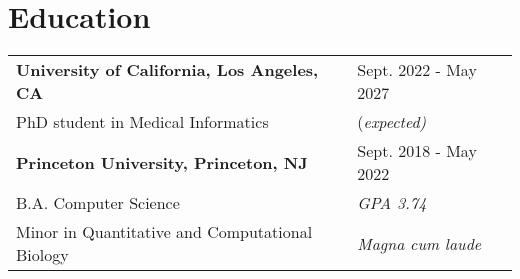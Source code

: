 \documentclass[a4paper,12pt]{article}
\begin{document}




\section{Education}
\begin{tabularx}{\linewidth}{@{}l X@{}}	
\textbf{University of California, Los Angeles, CA} &\hfill \normalsize Sept. 2022 - May 2027 \\
PhD student in Medical Informatics&\hfill \normalsize (\textit{expected)} \\

\textbf{Princeton University, Princeton, NJ} &\hfill Sept. 2018 - May 2022 \\ 

B.A. Computer Science& \hfill  \textit{GPA 3.74} \\

 Minor in Quantitative and Computational Biology  & \hfill  \textit{Magna cum laude} \\
\end{tabularx}
\end{document}
